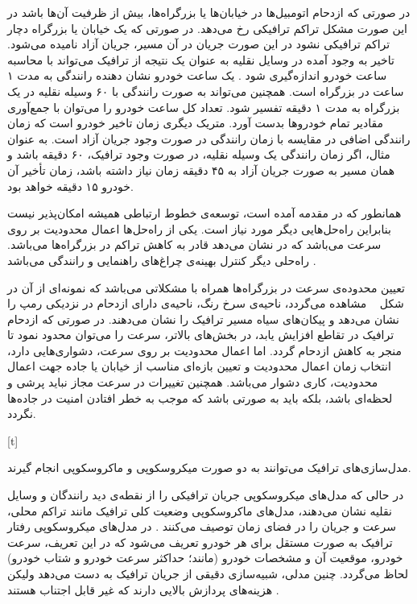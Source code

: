

در صورتی که ازدحام اتومبیل‌ها در خیابان‌ها یا بزرگراه‌ها، بیش از ظرفیت آن‌ها باشد در این صورت مشکل تراکم ترافیکی رخ می‌دهد. در صورتی که یک خیابان یا بزرگراه دچار تراکم ترافیکی نشود در این صورت جریان در آن مسیر، جریان آزاد نامیده می‌شود.
تاخیر به وجود آمده در وسایل نقلیه به عنوان یک نتیجه از ترافیک می‌تواند با محاسبه ساعت خودرو اندازه‌گیری شود \cite{Jacob2006}. یک ساعت خودرو نشان دهنده رانندگی به مدت ۱ ساعت در بزرگراه است. همچنین می‌تواند به صورت رانندگی با ۶۰ وسیله نقلیه در یک بزرگراه به مدت ۱ دقیقه تفسیر شود. تعداد کل ساعت خودرو را می‌توان با جمع‌آوری مقادیر تمام خودرو‌ها بدست آورد. متریک دیگری زمان تاخیر خودرو است که زمان رانندگی اضافی در مقایسه با زمان رانندگی در صورت وجود جریان آزاد است. به عنوان مثال، اگر زمان رانندگی یک وسیله نقلیه، در صورت وجود ترافیک، ۶۰ دقیقه باشد و همان مسیر به صورت جریان آزاد به ۴۵ دقیقه زمان نیاز داشته باشد، زمان تأخیر آن خودرو ۱۵ دقیقه خواهد بود.

همانطور که در مقدمه آمده است، توسعه‌ی خطوط ارتباطی همیشه امکان‌پذیر نیست  بنابراین راه‌حل‌هایی دیگر مورد نیاز است. یکی از راه‌حل‌ها اعمال محدودیت بر روی سرعت می‌باشد که در \cite{Jacob2006} نشان می‌دهد قادر به کاهش تراکم در بزرگراه‌ها می‌باشد.
راه‌حلی دیگر کنترل بهینه‌ی چراغ‌های راهنمایی و رانندگی می‌باشد \cite{Wiering2000, Touhbi2017}.

تعیین محدوده‌ی سرعت در بزرگراه‌ها همراه با مشکلاتی می‌باشد که نمونه‌ای از آن در شکل ~ مشاهده می‌گردد، ناحیه‌ی سرخ رنگ، ناحیه‌ی دارای ازدحام در نزدیکی رمپ را نشان می‌دهد و پیکان‌های سیاه مسیر ترافیک را نشان می‌دهند. در صورتی که ازدحام ترافیک در تقاطع افزایش یابد، در بخش‌های بالاتر، سرعت را می‌توان محدود نمود تا منجر به کاهش ازدحام گردد.
اما اعمال محدودیت بر روی سرعت، دشواری‌هایی دارد، انتخاب زمان اعمال محدودیت و تعیین بازه‌ای مناسب از خیابان یا جاده جهت اعمال محدودیت، کاری دشوار می‌باشد. 
همچنین تغییرات در سرعت مجاز نباید پرشی و لحظه‌ای باشد، بلکه باید به صورتی باشد که موجب به خطر افتادن امنیت در جاده‌ها نگردد.

[t]



مدل‌سازی‌های ترافیک می‌توانند به دو صورت میکروسکوپی و ماکروسکوپی انجام گیرند.

در حالی که مدل‌های میکروسکوپی جریان ترافیکی را از نقطه‌ی دید رانندگان و وسایل نقلیه نشان می‌دهند، مدل‌های ماکروسکوپی وضعیت کلی ترافیک  مانند تراکم محلی، سرعت و جریان را در فضای زمان توصیف می‌کنند \cite{Treiber2013}.
در مدل‌های میکروسکوپی رفتار ترافیک به صورت مستقل برای هر خودرو تعریف می‌شود که در این تعریف، سرعت خودرو، موقعیت آن و مشخصات خودرو (مانند؛ حداکثر سرعت خودرو و شتاب خودرو) لحاظ می‌گردد. چنین مدلی، شبیه‌سازی دقیقی از جریان ترافیک به دست می‌دهد ولیکن هزینه‌های پردازش بالایی دارند که غیر قابل اجتناب هستند \cite{Walraven2016}.